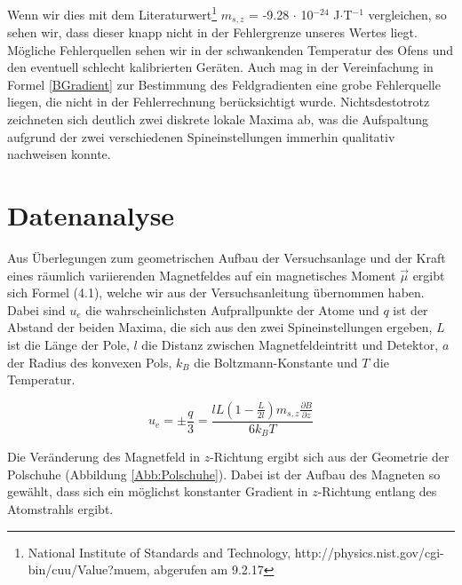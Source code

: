 \documentclass[a4paper,parskip,11pt, DIV12]{scrreprt}
\begin{document}
Wenn wir dies mit dem Literaturwert\footnote{National Institute of Standards and Technology, http://physics.nist.gov/cgi-bin/cuu/Value?muem, abgerufen am 9.2.17} $m_{s,z}$ = -9.28 $\cdot$ 10$^{-24}$ J$\cdot$T$^{-1}$ vergleichen, so sehen wir, dass dieser knapp nicht in der Fehlergrenze unseres Wertes liegt. Mögliche Fehlerquellen sehen wir in der schwankenden Temperatur des Ofens und den eventuell schlecht kalibrierten Geräten. Auch mag in der Vereinfachung in Formel \ref{BGradient} zur Bestimmung des Feldgradienten eine grobe Fehlerquelle liegen, die nicht in der Fehlerrechnung berücksichtigt wurde. Nichtsdestotrotz zeichneten sich deutlich zwei diskrete lokale Maxima ab, was die Aufspaltung aufgrund der zwei verschiedenen Spineinstellungen immerhin qualitativ nachweisen konnte.


\clearpage


\chapter{Datenanalyse}\label{Datenanalyse}

Aus Überlegungen zum geometrischen Aufbau der Versuchsanlage und der Kraft eines räumlich variierenden Magnetfeldes auf ein magnetisches Moment $\vec{ \mu }$ ergibt sich Formel (4.1), welche wir aus der Versuchsanleitung übernommen haben. Dabei sind $u_e$ die wahrscheinlichsten Aufprallpunkte der Atome und $q$ ist der Abstand der beiden Maxima, die sich aus den zwei Spineinstellungen ergeben, $L$ ist die Länge der Pole, $l$ die Distanz zwischen Magnetfeldeintritt und Detektor, $a$ der Radius des konvexen Pols, $k_B$ die Boltzmann-Konstante und $T$ die Temperatur.


\begin{equation}
u_e=\pm \frac{q}{3}=\frac{lL(1-\frac{L}{2l})m_{s,z} \frac{\partial B}{\partial z}}{6k_BT}
\end{equation}

Die Veränderung des Magnetfeld in $z$-Richtung ergibt sich aus der Geometrie der Polschuhe (Abbildung \ref{Abb:Polschuhe}). Dabei ist der Aufbau des Magneten so gewählt, dass sich ein möglichst konstanter Gradient in $z$-Richtung entlang des Atomstrahls ergibt.
\end{document}
